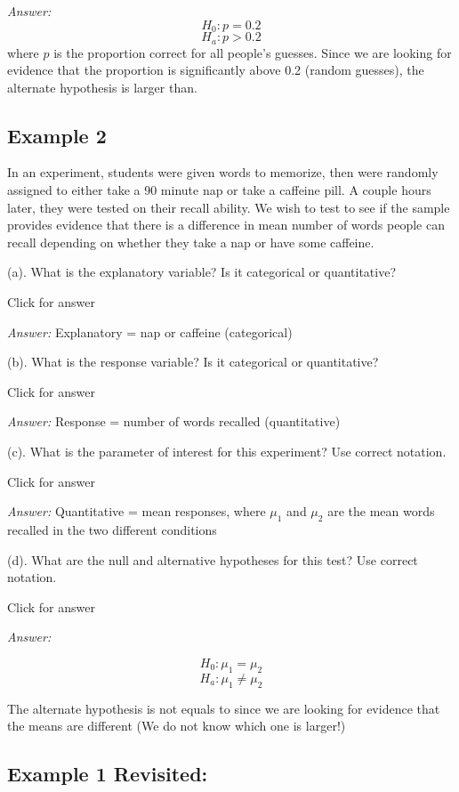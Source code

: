 \documentclass[
]{book}
\begin{document}
\emph{Answer:}
\[H_0: p = 0.2\]
\[H_a: p > 0.2\]
where \(p\) is the proportion correct for all people's guesses. Since we are looking for evidence that the proportion is significantly above 0.2 (random guesses), the alternate hypothesis is larger than.

\hypertarget{example-2}{%
\subsection{Example 2}\label{example-2}}

In an experiment, students were given words to memorize, then were randomly assigned to either take a 90 minute nap or take a caffeine pill. A couple hours later, they were tested on their recall ability. We wish to test to see if the sample provides evidence that there is a difference in mean number of words people can recall depending on whether they take a nap or have some caffeine.

(a). What is the explanatory variable? Is it categorical or quantitative?

Click for answer

\emph{Answer:} Explanatory = nap or caffeine (categorical)

(b). What is the response variable? Is it categorical or quantitative?

Click for answer

\emph{Answer:} Response = number of words recalled (quantitative)

(c). What is the parameter of interest for this experiment? Use correct notation.

Click for answer

\emph{Answer:}
Quantitative = mean responses, where \(\mu_1\) and \(\mu_2\) are the mean words recalled in the two different conditions

(d). What are the null and alternative hypotheses for this test? Use correct notation.

Click for answer

\emph{Answer:}

\[H_0: \mu_1 = \mu_2\]
\[H_a: \mu_1 \neq \mu_2\]

The alternate hypothesis is not equals to since we are looking for evidence that the means are different (We do not know which one is larger!)

\hypertarget{example-1-revisited}{%
\subsection{Example 1 Revisited:}\label{example-1-revisited}}
\end{document}
